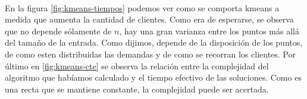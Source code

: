 \paragraph{} 
En la figura \ref{fig:kmeans-tiempos} podemos ver como se comporta kmeans a medida que aumenta la cantidad de clientes. Como era de esperarse, se observa que no depende sólamente de $n$, hay una gran varianza entre los puntos más allá del tamaño de la entrada. Como dijimos, depende de la disposición de los puntos, de como esten distribuidas las demandas y de como se recorran los clientes. Por último en \ref{fig:kmeans-cte} se observa la relación entre la complejidad del algoritmo que habíamos calculado y el tiempo efectivo de las soluciones. Como es una recta que se mantiene constante, la complejidad puede ser acertada.



